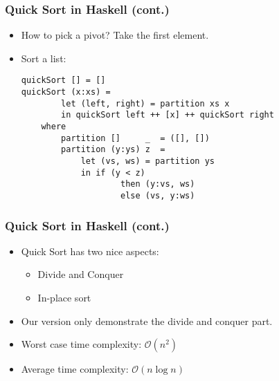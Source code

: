 \documentclass[final,handout]{beamer}
\begin{document}
\begin{frame}[fragile]
    \frametitle{Quick Sort in Haskell (cont.)}

    \begin{itemize}
        \item How to pick a pivot? \pause Take the first element.
        \item<3-> Sort a list:

            \begin{verbatim}
quickSort [] = []
quickSort (x:xs) =
        let (left, right) = partition xs x
        in quickSort left ++ [x] ++ quickSort right
    where
        partition []     _  = ([], [])
        partition (y:ys) z  =
            let (vs, ws) = partition ys
            in if (y < z) 
                    then (y:vs, ws)
                    else (vs, y:ws)
            \end{verbatim}
    \end{itemize}
\end{frame}

\begin{frame}[fragile]
    \frametitle{Quick Sort in Haskell (cont.)}

    \begin{itemize}
        \item Quick Sort has two nice aspects:
            \begin{itemize}
                \item Divide and Conquer
                \item In-place sort
            \end{itemize}
        \item Our version only demonstrate the divide and conquer part.
        \item Worst case time complexity: $\mathcal{O}(n^2)$
        \item Average time complexity: $\mathcal{O}(n \log n)$
    \end{itemize}
\end{frame}




%
%
\end{document}
